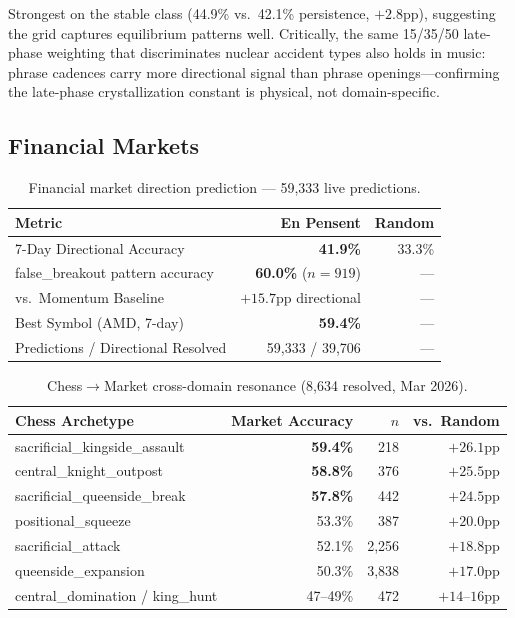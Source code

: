\documentclass[12pt,a4paper]{article}
\begin{document}
Strongest on the stable class (44.9\% vs.\ 42.1\% persistence, $+2.8$pp), suggesting the grid
captures equilibrium patterns well. Critically, the same 15/35/50 late-phase weighting that
discriminates nuclear accident types also holds in music: phrase cadences carry more directional
signal than phrase openings---confirming the late-phase crystallization constant is physical, not
domain-specific.

\subsection{Financial Markets}

\begin{table}[H]
\centering
\caption{Financial market direction prediction --- 59,333 live predictions.}
\label{tab:market}
\begin{tabular}{lrr}
\toprule
\textbf{Metric} & \textbf{En Pensent} & \textbf{Random} \\
\midrule
7-Day Directional Accuracy & \textbf{41.9\%} & 33.3\% \\
false\_breakout pattern accuracy & \textbf{60.0\%} ($n{=}919$) & --- \\
vs.\ Momentum Baseline & $+15.7$pp directional & --- \\
Best Symbol (AMD, 7-day) & \textbf{59.4\%} & --- \\
Predictions / Directional Resolved & 59,333 / 39,706 & --- \\
\bottomrule
\end{tabular}
\end{table}

\begin{table}[H]
\centering
\caption{Chess$\rightarrow$Market cross-domain resonance (8,634 resolved, Mar 2026).}
\label{tab:resonance}
\begin{tabular}{lrrr}
\toprule
\textbf{Chess Archetype} & \textbf{Market Accuracy} & \boldmath$n$ & \textbf{vs.\ Random} \\
\midrule
sacrificial\_kingside\_assault & \textbf{59.4\%} & 218 & $+26.1$pp \\
central\_knight\_outpost       & \textbf{58.8\%} & 376 & $+25.5$pp \\
sacrificial\_queenside\_break  & \textbf{57.8\%} & 442 & $+24.5$pp \\
positional\_squeeze            & 53.3\% & 387 & $+20.0$pp \\
sacrificial\_attack            & 52.1\% & 2,256 & $+18.8$pp \\
queenside\_expansion           & 50.3\% & 3,838 & $+17.0$pp \\
central\_domination / king\_hunt & 47--49\% & 472 & $+14$--$16$pp \\
\bottomrule
\end{tabular}
\end{table}
\end{document}
